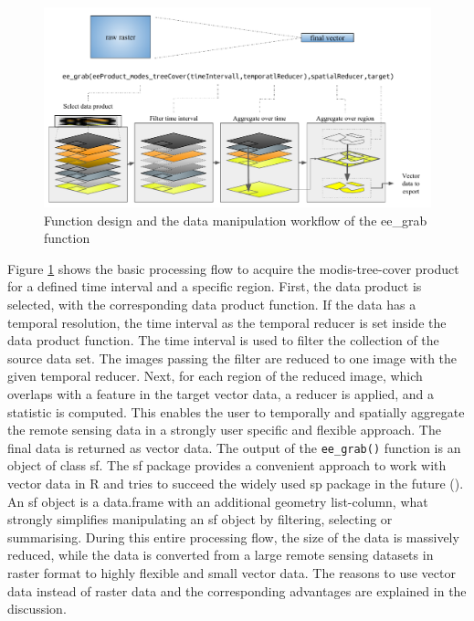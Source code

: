 \begin{center}
	\begin{figure}[h]
		\begin{center}
			\includegraphics[width=15cm]{images/design_function-cropped.pdf}
			\caption{Function design and the data manipulation workflow of the ee\_grab function}
			\label{Workflow}
		\end{center}
	\end{figure}
\end{center}

Figure \ref{Workflow} shows the basic processing flow to acquire the modis-tree-cover product for a defined time interval and a specific region. First, the data product is selected, with the corresponding data product function. If the data has a temporal resolution, the time interval as the temporal reducer is set inside the data product function. The time interval is used to filter the collection of the source data set. The images passing the filter are reduced to one image with the given temporal reducer. Next, for each region of the reduced image, which overlaps with a feature in the target vector data, a reducer is applied, and a statistic is computed. This enables the user to temporally and spatially aggregate the remote sensing data in a strongly user specific and flexible approach. The final data is returned as vector data.
The output of the \texttt{ee\_grab()} function is an object of class sf. The sf package provides a convenient approach to work with vector data in R and tries to succeed the widely used sp package in the future (\cite{sf}). An sf object is a data.frame with an additional geometry list-column, what strongly simplifies manipulating an sf object by filtering, selecting or summarising. 
During this entire processing flow, the size of the data is massively reduced, while the data is converted from a large remote sensing datasets in raster format to highly flexible and small vector data. The reasons to use vector data instead of raster data and the corresponding advantages are explained in the discussion.


